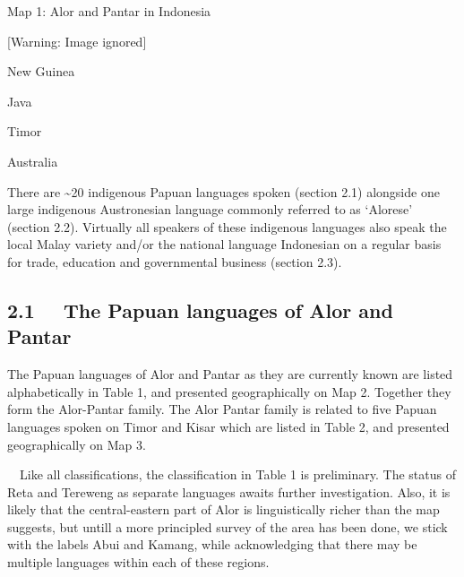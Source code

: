 {\centering
Map 1: Alor and Pantar in Indonesia
\par}

  [Warning: Image ignored] %
 

\begin{center}
\begin{minipage}{0.7752in}
New Guinea
\end{minipage}
\end{center}
\begin{center}
\begin{minipage}{0.5484in}
Java
\end{minipage}
\end{center}
\begin{center}
\begin{minipage}{0.702in}
Timor
\end{minipage}
\end{center}
\begin{center}
\begin{minipage}{1.0173in}
Australia
\end{minipage}
\end{center}

There are \~{}20 indigenous Papuan languages spoken (section 2.1) alongside one large indigenous Austronesian language commonly referred to as {\textquoteleft}Alorese{\textquoteright} (section 2.2). Virtually all speakers of these indigenous languages also speak the local Malay variety and/or the national language Indonesian on a regular basis for trade, education and governmental business (section 2.3). 

\subsection[2.1 \ \ The Papuan languages of Alor and Pantar ]{2.1 \ \ The Papuan languages of Alor and Pantar }
The Papuan languages of Alor and Pantar as they are currently known are listed alphabetically in Table 1, and presented geographically on Map 2. Together they form the Alor-Pantar family. The Alor Pantar family is related to five Papuan languages spoken on Timor and Kisar which are listed in Table 2, and presented geographically on Map 3.

\ \ Like all classifications, the classification in Table 1 is preliminary. The status of Reta and Tereweng as separate languages awaits further investigation. Also, it is likely that the central-eastern part of Alor is linguistically richer than the map suggests, but untill a more principled survey of the area has been done, we stick with the labels Abui and Kamang, while acknowledging that there may be multiple languages within each of these regions. 

